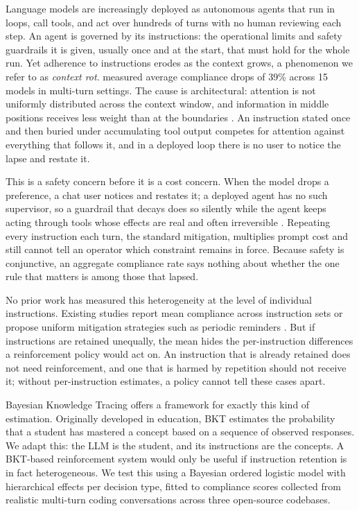 \documentclass{llncs}
\begin{document}
Language models are increasingly deployed as autonomous agents that run
in loops, call tools, and act over hundreds of turns with no human
reviewing each step. An agent is governed by its instructions: the
operational limits and safety guardrails it is given, usually once and at
the start, that must hold for the whole run. Yet adherence to instructions
erodes as the context grows, a phenomenon we refer to as \emph{context
rot}. \textcite{laban2025} measured average compliance drops of 39\%
across 15 models in multi-turn settings. The cause is architectural:
attention is not uniformly distributed across the context window, and
information in middle positions receives less weight than at the
boundaries \parencite{liu2024, chowdhury2026}. An instruction stated once
and then buried under accumulating tool output competes for attention
against everything that follows it, and in a deployed loop there is no
user to notice the lapse and restate it.

This is a safety concern before it is a cost concern. When the model drops
a preference, a chat user notices and restates it; a deployed agent has no
such supervisor, so a guardrail that decays does so silently while the
agent keeps acting through tools whose effects are real and often
irreversible \parencite{mu2025}. Repeating every instruction each turn,
the standard mitigation, multiplies prompt cost and still cannot tell an
operator which constraint remains in force. Because safety is conjunctive,
an aggregate compliance rate says nothing about whether the one rule that
matters is among those that lapsed.

No prior work has measured this heterogeneity at the level of individual
instructions. Existing studies report mean compliance across instruction
sets \parencite{laban2025, he2024} or propose uniform mitigation
strategies such as periodic reminders \parencite{dongre2025}. But if
instructions are retained unequally, the mean hides the
per-instruction differences a reinforcement policy would act on. An instruction that is already retained does not need reinforcement, and
one that is harmed by repetition should not receive it; without
per-instruction estimates, a policy cannot tell these cases apart.

Bayesian Knowledge Tracing \parencite{corbett1994} offers a framework
for exactly this kind of estimation. Originally developed in education,
BKT estimates the probability that a student has mastered a concept
based on a sequence of observed responses. We adapt this: the LLM is
the student, and its instructions are the concepts. A BKT-based reinforcement system would only be useful if instruction
retention is in fact heterogeneous. We test this using a Bayesian ordered logistic model with
hierarchical effects per decision type, fitted to compliance scores
collected from realistic multi-turn coding conversations across three
open-source codebases.
\end{document}
